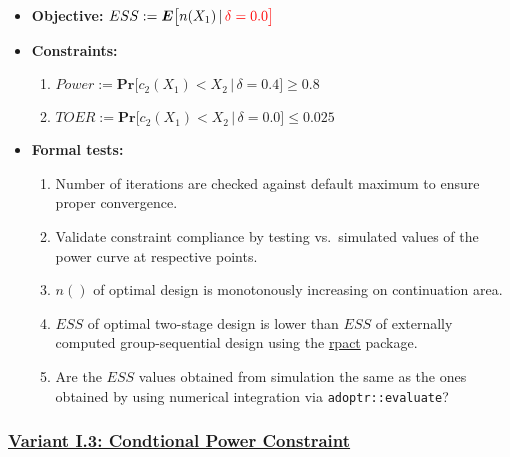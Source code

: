 \documentclass[
]{book}
\providecommand{\tightlist}{%
  \setlength{\itemsep}{0pt}\setlength{\parskip}{0pt}}
\begin{document}
\begin{itemize}
\tightlist
\item
  \textbf{Objective:} \(ESS := \boldsymbol{E}\big[n(X_1)\,|\,\color{red}{\delta=0.0}\big]\)
\item
  \textbf{Constraints:}

  \begin{enumerate}
  \def\labelenumi{\arabic{enumi}.}
  \tightlist
  \item
    \(Power := \boldsymbol{Pr}\big[c_2(X_1) < X_2\,|\,\delta=0.4\big] \geq 0.8\)
  \item
    \(TOER := \boldsymbol{Pr}\big[c_2(X_1) < X_2\,|\,\delta=0.0\big] \leq 0.025\)
  \end{enumerate}
\item
  \textbf{Formal tests:}

  \begin{enumerate}
  \def\labelenumi{\arabic{enumi}.}
  \tightlist
  \item
    Number of iterations are checked against default maximum to ensure proper
    convergence.
  \item
    Validate constraint compliance by testing vs.~simulated
    values of the power curve at respective points.
  \item
    \(n()\) of optimal design is monotonously increasing on continuation area.
  \item
    \(ESS\) of optimal two-stage design is lower than \(ESS\) of externally
    computed group-sequential design using the \href{https://rpact.org/}{rpact} package.
  \item
    Are the \(ESS\) values obtained from simulation the same as the ones
    obtained by using numerical integration via \texttt{adoptr::evaluate}?
  \end{enumerate}
\end{itemize}

\hypertarget{variant-i.3-condtional-power-constraint}{%
\subsubsection{\texorpdfstring{\protect\hyperlink{variantI_3}{Variant I.3: Condtional Power Constraint}}{Variant I.3: Condtional Power Constraint}}\label{variant-i.3-condtional-power-constraint}}
\end{document}
